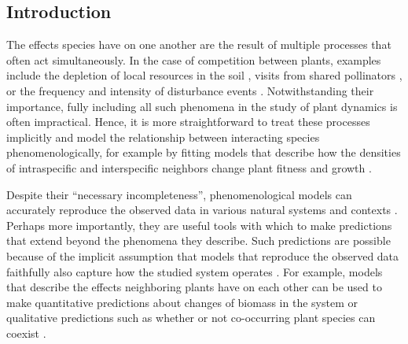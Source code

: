 \begin{refsection}
\section*{Introduction}


The effects species have on one another are the result of multiple processes that often act simultaneously. In the case of competition between plants, examples include the depletion of local resources in the soil \citep{dybzinski2007resource, craine2013mechanisms},  visits from shared pollinators \citep{lanuza_opposing_2018}, or the frequency and intensity of disturbance events \citep{pickett1980non, villarreal2009species}. Notwithstanding their importance, fully including all such phenomena in the study of plant dynamics is often impractical. Hence, it is more straightforward to treat these processes implicitly and model the relationship between interacting species phenomenologically, for example by fitting models that describe how the densities of intraspecific and interspecific neighbors change plant fitness and growth \citep{case1999illustrated, adler2018competition}.


Despite their ``necessary incompleteness'', phenomenological models can accurately reproduce the observed data in various natural systems and contexts \citep{bolker_ecological_2008}. Perhaps more importantly, they are useful tools with which to make predictions that extend beyond the phenomena they describe. Such predictions are possible because of the implicit assumption that models that reproduce the observed data faithfully also capture how the studied system operates \citep{marquet2015importance}. For example, models that describe the effects neighboring plants have on each other can be used to make quantitative predictions about changes of biomass in the system \citep{godoy2020excess, lai2020role} or qualitative predictions such as whether or not co-occurring plant species can coexist \citep{levine2009importance, zepeda2019fluctuation}.



\end{refsection}
